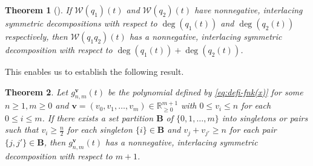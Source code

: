 \documentclass[12pt]{article}
\newtheorem{thm}{Theorem}[section]
\numberwithin{equation}{section}
\begin{document}
\begin{thm}[{\cite[Theorem 1.5 and Proposition 4.6]{Branden-2024}}]\label{thm:haremard-real-brenti}
If $\mathcal{W}(q_1)(t)$ and $\mathcal{W}(q_2)(t)$ have nonnegative, interlacing symmetric decompositions with respect to $\deg(q_1(t))$ and $\deg(q_2(t))$ respectively, then $\mathcal{W}(q_1q_2)(t)$ has a nonnegative, interlacing symmetric decomposition with respect to $\deg(q_1(t))+\deg(q_2(t))$.
\end{thm}

This enables us to establish the following result. 

\begin{thm}\label{eq-results}
Let $g^{\mathbf{v}}_{n,m}(t)$ be the polynomial defined by \eqref{eq:defi-fnk(x)} for some $n\geq 1, m\geq 0$ and $\mathbf{v} = (v_0, v_1, \ldots, v_m)\in \mathbb{R}_{\geq 0}^{m+1}$ with $0\le v_i\le n$ for each $0\leq i\leq m$.
If there exists a set partition $\mathbf{B}$ of 
$\{0,1,\ldots,m\}$ into singletons or pairs such that $v_i\ge \frac{n}{2}$ for each singleton $\{i\}\in \mathbf{B}$ and 
$v_{j}+v_{j'}\ge n$ for each pair $\{j,j'\}\in \mathbf{B}$, then $g^{\mathbf{v}}_{n,m}(t)$ has a nonnegative, interlacing symmetric decomposition with respect to $m+1$.
\end{thm}
\end{document}

